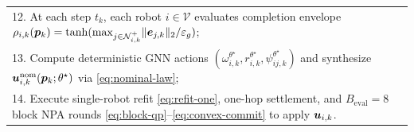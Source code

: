 \begin{table}[htbp]
\begin{tabularx}{\columnwidth}{@{}X@{}}
 \midrule
 12. At each step $t_k$, each robot $i\in\mathcal V$ evaluates completion envelope $\rho_{i,k}(\boldsymbol{p}_k)=\tanh(\max_{j\in\mathcal N_{i,k}^+}\lVert\boldsymbol{e}_{j,k}\rVert_2/\varepsilon_g)$;\\
 13. Compute deterministic GNN actions $(\omega_{i,k}^{\theta^\star},r_{i,k}^{\theta^\star},\psi_{ij,k}^{\theta^\star})$ and synthesize $\boldsymbol{u}_{i,k}^{\mathrm{nom}}(\boldsymbol{p}_k;\theta^\star)$ via \eqref{eq:nominal-law};\\
 14. Execute single-robot refit \eqref{eq:refit-one}, one-hop settlement, and $B_{\mathrm{eval}}=8$ block NPA rounds \eqref{eq:block-qp}--\eqref{eq:convex-commit} to apply $\boldsymbol{u}_{i,k}$.\\
 \bottomrule
 \end{tabularx}
\end{table}

